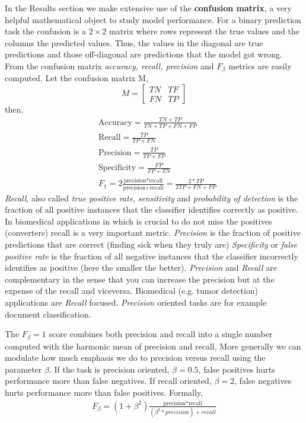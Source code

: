 \documentclass[11pt]{article}
\theoremstyle{definition}
\theoremstyle{remark}
\begin{document}
In the Results section we make extensive use of the \textbf{confusion matrix}, a very helpful mathematical object to study model performance. For a binary prediction task the confusion is a $2 \times 2$ matrix where rows represent the true values and the columns the predicted values. Thus, the values in the diagonal are true predictions and those off-diagonal are predictions that the model got wrong. From the confusion matrix \emph{accuracy, recall, precision} and $F_\beta$ metrics are easily computed.
Let the confusion matrix M,  
\begin{equation*}
M=
  \begin{bmatrix}
    TN & TF  \\
    FN & TP 
  \end{bmatrix}
\end{equation*}
then, 
\begin{equation*}
\begin{split}
&\text{Accuracy} = \frac{TN + TP}{TN+TP+FN+FP} \\
&\text{Recall} = \frac{TP}{TP+FN} \\
&\text{Precision} = \frac{TP}{TP+FP} \\
&\text{Specificity} = \frac{FP}{FP+TN} \\
&F_1 = 2\frac{\text{precision*recall}}{\text{precision}+\text{recall}} = \frac{2 * TP}{2TP + FN + FP}
\end{split}
\end{equation*}
\emph{Recall}, also called \emph{true positive rate}, \emph{sensitivity} and \emph{probability of detection} is the fraction of all positive instances that the classifier identifies correctly as positive. In biomedical applications in which is crucial to do not miss the positives (converters) recall is a very important metric.
\emph{Precision} is the fraction of positive predictions that are correct (finding sick when they truly are)
\emph{Specificity} or \emph{false positive rate} is the fraction of all negative instances that the classifier incorrectly identifies as positive (here the smaller the better).
\emph{Precision} and \emph{Recall} are complementary in the sense that you can increase the precision but at the expense of the recall and viceversa. Biomedical (e.g. tumor detection) applications are \emph{Recall} focused. \emph{Precision} oriented tasks are for example document classification. 

The $F_{\beta}=1$ score combines both precision and recall into a single number computed with the harmonic mean of precision and recall, More generally we can modulate how much emphasis we do to precision versus recall using the parameter $\beta$. 
If the task is precision oriented, $\beta=0.5$, false positives hurts performance more than false negatives. If recall oriented, $\beta=2$, false negatives hurts performance more than false positives. Formally, 
\begin{equation*}
\begin{split}
F_{\beta} = (1+\beta^2)\frac{\text{precision*recall}}{(\beta^2 * precision)+recall} 
\end{split}
\end{equation*}
\end{document}
